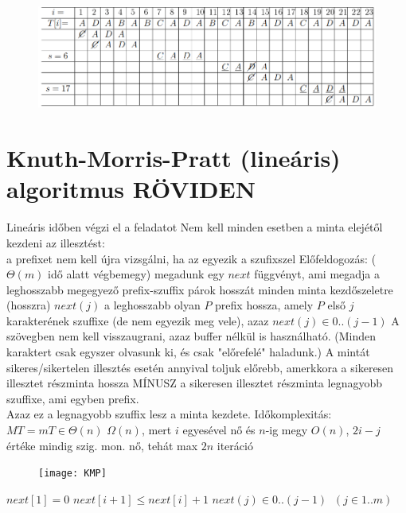 \documentclass[12pt,a4paper]{article}
\begin{document}
\begin{figure}[h!]
	\centering
	\includegraphics[width=1\linewidth]{QuickSearch-példa-táblázat}
\end{figure}

\pagebreak

\section{Knuth-Morris-Pratt (lineáris) algoritmus RÖVIDEN}

\begin{outline}
	\1 Lineáris időben végzi el a feladatot
	\1 Nem kell minden esetben a minta elejétől kezdeni az illesztést:\\
	a prefixet nem kell újra vizsgálni, ha az egyezik a szufixszel
	\1 Előfeldogozás: ($\Theta(m)$ idő alatt végbemegy)
		\2 megadunk egy $next$ függvényt, ami megadja a leghosszabb megegyező prefix-szuffix párok hosszát minden minta kezdőszeletre (hosszra)
		\2 $next(j)$ a leghosszabb olyan $P$ prefix hossza, amely $P$ első $j$ karakterének szuffixe (de nem egyezik meg vele), azaz $next(j) \in 0..(j-1)$
	\1 A szövegben nem kell visszaugrani, azaz buffer nélkül is használható.
	(Minden karaktert csak egyszer olvasunk ki, és csak "előrefelé" haladunk.)
	\1 A mintát sikeres/sikertelen illesztés esetén annyival toljuk előrebb,
	amerkkora a sikeresen illesztet részminta hossza MÍNUSZ
	a sikeresen illesztet részminta legnagyobb szuffixe, ami egyben prefix.\\
	Azaz ez a legnagyobb szuffix lesz a minta kezdete.
	\1 Időkomplexitás: $MT = mT \in \Theta(n)$
		\2 $\Omega(n)$, mert $i$ egyesével nő és $n$-ig megy
		\2 $O(n)$, $2i-j$ értéke mindig szig. mon. nő, tehát max $2n$ iteráció
\end{outline}

\begin{figure}[h!]
	\centering
	\texttt{[image: KMP]}
\end{figure}

\begin{outline}
	\1 $next[1]=0$
	\1 $next[i+1] \le next[i]+1$
	\1 $next(j) \in 0..(j-1) \;\; (j \in 1..m)$
\end{outline}
\end{document}
